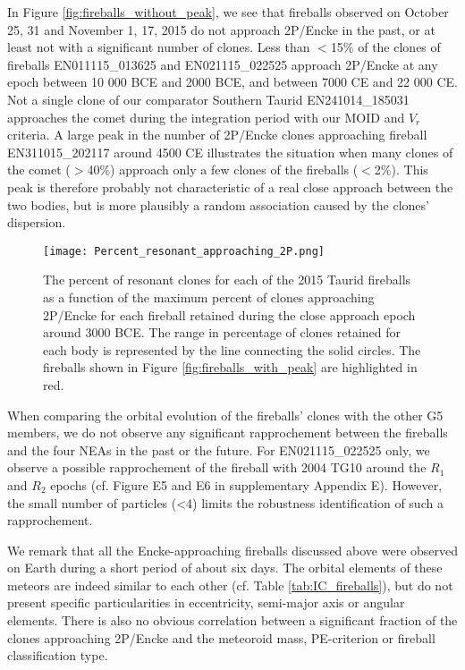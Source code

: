 \documentclass[letters,a4paper,fleqn,usenatbib]{mnras}
\begin{document}
 In Figure \ref{fig:fireballs_without_peak}, we see that fireballs observed on October 25, 31 and November 1, 17, 2015 do not approach 2P/Encke in the past, or at least not with a significant number of clones. Less than $<$15\% of the clones of fireballs EN011115\_013625 and EN021115\_022525 approach 2P/Encke at any epoch between 10 000 BCE and 2000 BCE, and between 7000 CE and 22 000 CE. Not a single clone of our comparator Southern Taurid EN241014\_185031 approaches the comet during the integration period with our MOID and $V_r$ criteria. A large peak in the number of 2P/Encke clones approaching fireball EN311015\_202117 around 4500 CE illustrates the situation when many clones of the comet ($>$40\%) approach only a few clones of the fireballs ($<$2\%). This peak is therefore probably not characteristic of a real close approach between the two bodies, but is more plausibly a random association caused by the clones' dispersion.
 
 
 \begin{figure}
 	\centering
 	\texttt{[image: Percent\_resonant\_approaching\_2P.png]}
 	\caption{The percent of resonant clones for each of the 2015 Taurid fireballs as a function of the maximum percent of clones approaching 2P/Encke for each fireball retained during the close approach epoch around 3000 BCE. The range in percentage of clones retained for each body is represented by the line connecting the solid circles. The fireballs shown in Figure \ref{fig:fireballs_with_peak} are highlighted in red.}
 	\label{fig:percent_fireballs_approaching_2P}
 \end{figure}
 
 When comparing the orbital evolution of the fireballs' clones with the other G5 members, we do not observe any significant rapprochement between the fireballs and the four NEAs in the past or the future. For EN021115\_022525 only, we observe a possible rapprochement of the fireball with 2004 TG10 around the $R_1$ and $R_2$ epochs (cf. Figure E5 and E6 in supplementary Appendix E). However, the small number of particles (<4) limits the robustness identification of such a rapprochement. 

 We remark that all the Encke-approaching fireballs discussed above were observed on Earth during a short period of about six days. The orbital elements of these meteors are indeed similar to each other (cf. Table \ref{tab:IC_fireballs}), but do not present specific particularities in eccentricity, semi-major axis or angular elements. There is also no obvious correlation between a significant fraction of the clones approaching 2P/Encke and the meteoroid mass, PE-criterion or fireball classification type.
 
\end{document}
